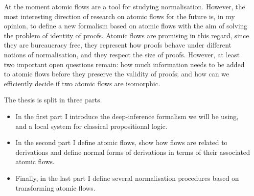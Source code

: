 At the moment atomic flows are a tool for studying normalisation. However, the most interesting direction of research on atomic flows for the future is, in my opinion, to define a new formalism based on atomic flows with the aim of solving the problem of identity of proofs. Atomic flows are promising in this regard, since they are bureaucracy free, they represent how proofs behave under different notions of normalisation, and they respect the size of proofs. However, at least two important open questions remain: how much information needs to be added to atomic flows before they preserve the validity of proofs; and how can we efficiently decide if two atomic flows are isomorphic.


The thesis is split in three parts.
\begin{itemize}
\item In the first part I introduce the deep-inference formalism we will be using, and a local system for classical propositional logic.
\item In the second part I define atomic flows, show how flows are related to derivations and define normal forms of derivations in terms of their associated atomic flows.
\item Finally, in the last part I define several normalisation procedures based on transforming atomic flows.
\end{itemize}